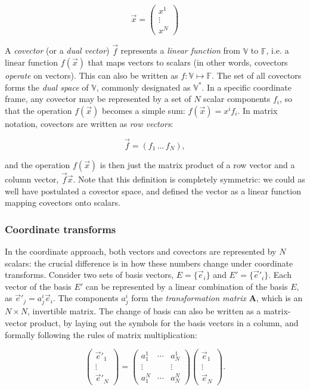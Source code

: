 \documentclass{aa}
\begin{document}
\[
  \vec x = \left ( \begin{array}{c} x^1\\ \vdots \\ x^N \end{array} \right )
\]


A \emph{covector} (or a {\em dual vector\/}) $\vec f$ represents a {\em linear function} from $\mathbb{V}$ to $\mathbb{F}$, i.e. a linear function $f(\vec x)$ that maps vectors to scalars (in other words, covectors {\em operate\/} on vectors). This can also be written as $f:\mathbb{V}\mapsto\mathbb{F}$. The set of all covectors forms the {\em dual space\/} of $\mathbb{V}$, commonly designated as $\mathbb{V}^*$. In a specific coordinate frame, any covector may be represented by a set of $N$ scalar components $f_i$, so that the operation  $f(\vec x)$ becomes a simple sum: $f(\vec x) = x^if_i.$ In matrix notation, covectors are written as \emph{row vectors\/}:

\[
\vec f = \left( f_1 \, ... \, f_N \right), 
\]

and the operation $f(\vec x)$ is then just the matrix product of a row vector and a column vector, $\vec f\vec x$. Note that this definition is completely symmetric: we could as well have postulated a covector space, and defined the vector as a linear function mapping covectors onto scalars.

\subsubsection{Coordinate transforms}

In the coordinate approach, both vectors and covectors are represented by $N$ scalars: the crucial difference is in how these numbers change under coordinate transforms. Consider two sets of basis vectors, $E=\{\vec e_i\}$ and $E'=\{\vec e'_i\}$. Each vector of the basis $E'$ can be represented by a linear combination of the basis $E$, as $\vec e'_j = a^i_j \vec e_i$. The components $a^i_j$ form the {\em transformation matrix} $\mathbf{A}$, which is an $N\times N$, invertible matrix. The change of basis can also be written as a matrix-vector product, by laying out the symbols for the basis vectors in a column, and formally following the rules of matrix multiplication:

\[
    \left( \begin{array}{c} \vec e'_1 \\ \vdots \\ \vec e'_N \end{array} \right ) = 
    \left( \begin{array}{ccc} 
      a^1_1 & \cdots & a^1_N \\
      \vdots & & \vdots \\
      a^N_1 & \cdots & a^N_N 
    \end{array} \right )  
    \left( \begin{array}{c} \vec e_1 \\ \vdots \\ \vec e_N \end{array}  \right ).
\]
\end{document}
